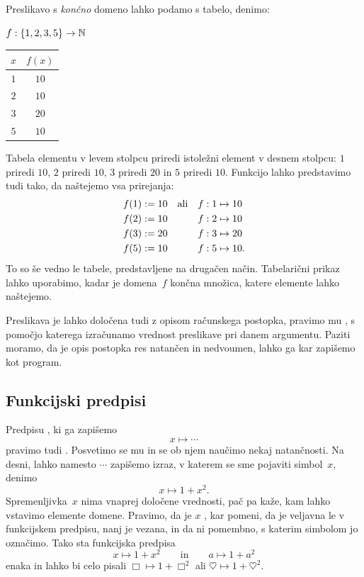 Preslikavo s \emph{končno} domeno lahko podamo s tabelo, denimo:
%
\begin{center}
  $f : \left\{1, 2, 3, 5\right\} \to \mathbb{N}$

  \medskip

  \begin{tabular}{cc}
    \toprule
    $x$ & $f(x)$ \\ \midrule
    $1$ & $10$ \\ 
    $2$ & $10$ \\ 
    $3$ & $20$ \\ 
    $5$ & $10$ \\ \bottomrule
  \end{tabular}
\end{center}
%
Tabela elementu v levem stolpcu priredi istoležni element v desnem stolpcu: $1$ priredi $10$, $2$ priredi $10$, $3$ priredi $20$ in $5$ priredi $10$. Funkcijo lahko predstavimo tudi tako, da naštejemo vsa prirejanja:
%
\begin{align*}
  f(1) &\mathrel{{:}{=}} 10    &&\text{ali}&    f : 1 &\mapsto 10 \\
  f(2) &\mathrel{{:}{=}} 10    &&&    f : 2 &\mapsto 10 \\
  f(3) &\mathrel{{:}{=}} 20    &&&    f : 3 &\mapsto 20 \\
  f(5) &\mathrel{{:}{=}} 10    &&&    f : 5 &\mapsto 10.
\end{align*}
%
To so še vedno le tabele, predstavljene na drugačen način.
%
Tabelarični prikaz lahko uporabimo, kadar je domena~$f$ končna množica, katere elemente lahko naštejemo.

Preslikava je lahko določena tudi z opisom računskega postopka, pravimo mu ,
s pomočjo katerega izračunamo vrednost preslikave pri danem argumentu. Paziti moramo, da je
opis postopka res natančen in nedvoumen, lahko ga kar zapišemo kot program.


\subsection{Funkcijski predpisi}
\label{sec:funkcijski-predpisi}

Predpisu , ki ga zapišemo
%
\begin{equation*}
  x \mapsto \cdots
\end{equation*}
%
pravimo tudi . Posvetimo se mu in se ob njem naučimo nekaj natančnosti.
Na desni, lahko namesto $\cdots$ zapišemo izraz, v katerem se sme pojaviti simbol~$x$, denimo
%
\begin{equation*}
  x \mapsto 1 + x^2.
\end{equation*}
%
Spremenljivka~$x$ nima vnaprej določene vrednosti, pač pa kaže, kam lahko vstavimo
elemente domene. Pravimo, da je $x$ , kar pomeni, da je veljavna
le v funkcijskem predpisu, nanj je vezana, in da ni pomembno, s katerim simbolom jo
označimo. Tako sta funkcijska predpisa
%
\begin{equation*}
  x \mapsto 1 + x^2
  \qquad\text{in}\qquad
  a \mapsto 1 + a^2
\end{equation*}
%
enaka in lahko bi celo pisali $\Box \mapsto 1 + \Box^2$ ali
$\heartsuit \mapsto 1 + \heartsuit^2$.

